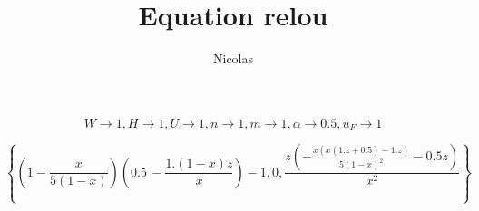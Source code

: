 \documentclass[11pt]{article}
\title{\textbf{Equation relou}}
\author{Nicolas}
\date{}
\begin{document}
\maketitle

\[
W\to 1,H\to 1,U\to 1,n\to 1,m\to 1,\alpha \to 0.5,u_F\to 1
\]

\[
\left\{\left(1-\frac{x}{5 (1-x)}\right) \left(0.5\, -\frac{1. (1-x) z}{x}\right)-1,0,\frac{z \left(-\frac{x (x (1. z+0.5)-1. z)}{5 (1-x)^2}-0.5 z\right)}{x^2}\right\}
\]
\end{document}
